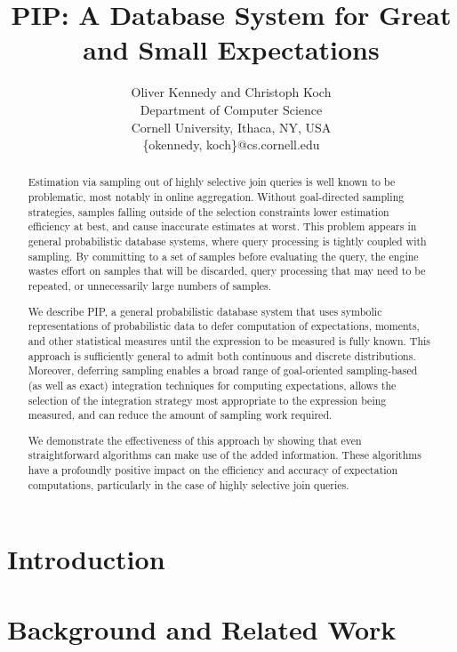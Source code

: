 \documentclass[10pt,conference,letterpaper]{IEEEtran}
\title{PIP: A Database System for Great and Small Expectations}
\author{Oliver Kennedy and Christoph Koch\\
Department of Computer Science \\
Cornell University, Ithaca, NY, USA\\
\{okennedy, koch\}@cs.cornell.edu}
\date{}
\begin{document}
\maketitle



\begin{abstract}
Estimation via sampling out of highly selective join queries is well known to be problematic, most notably in online aggregation.  Without goal-directed sampling strategies, samples falling outside of the selection constraints lower estimation efficiency at best, and cause inaccurate estimates at worst.  This problem appears in general probabilistic database systems, where query processing is tightly coupled with sampling.  By committing to a set of samples before evaluating the query, the engine wastes effort on samples that will be discarded, query processing that may need to be repeated, or unnecessarily large numbers of samples.  

We describe PIP, a general probabilistic database system that uses symbolic representations of probabilistic data to defer computation of expectations, moments, and other statistical measures until the expression to be measured is fully known.  This approach is sufficiently general to admit both continuous and discrete distributions.  Moreover, deferring sampling enables a broad range of goal-oriented sampling-based (as well as exact) integration techniques for computing expectations, allows the selection of the integration strategy most appropriate to the expression being measured, and can reduce the amount of sampling work required.  

We demonstrate the effectiveness of this approach by showing that even straightforward algorithms can make use of the added information.  These algorithms have a profoundly positive impact on the efficiency and accuracy of expectation computations, particularly in the case of highly selective join queries.
\end{abstract}



\section{Introduction}
\label{sec:introduction}


\section{Background and Related Work}
\label{sec:background}

\end{document}
